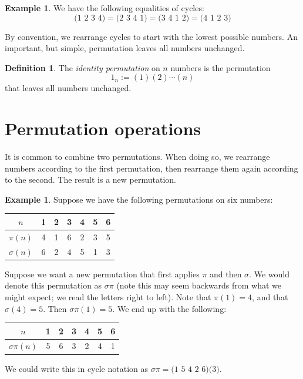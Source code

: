 \documentclass{book}
\theoremstyle{plain}
\theoremstyle{definition}
\newtheorem{definition}[theorem]{Definition}
\newtheorem{example}[theorem]{Example}
\begin{document}
\begin{example}
We have the following equalities of cycles: $$\text{(1 2 3 4)} = \text{(2 3 4 1)} = \text{(3 4 1 2)} = \text{(4 1 2 3)}$$
\end{example}

By convention, we rearrange cycles to start with the lowest possible numbers. An important, but simple, permutation leaves all numbers unchanged.

\begin{definition}
The {\it identity permutation} on $n$ numbers is the permutation $$1_n := (1)(2)\cdots(n)$$ that leaves all numbers unchanged.
\end{definition}

\section{Permutation operations}
It is common to combine two permutations. When doing so, we rearrange numbers according to the first permutation, then rearrange them again according to the second. The result is a new permutation.

\begin{example}
Suppose we have the following permutations on six numbers:
\begin{center}
\begin{tabular}{|c|cccccc|}
\hline
$n$ & 1 & 2 & 3 & 4 & 5 & 6 \\
\hline
$\pi(n)$ & 4 & 1 & 6 & 2 & 3 & 5 \\
\hline
$\sigma(n)$ & 6 & 2 & 4 & 5 & 1 & 3 \\
\hline
\end{tabular}
\end{center}

Suppose we want a new permutation that first applies $\pi$ and then $\sigma$. We would denote this permutation as $\sigma\pi$ (note this may seem backwards from what we might expect; we read the letters right to left). Note that $\pi(1) = 4$, and that $\sigma(4) = 5$. Then $\sigma\pi(1) = 5$. We end up with the following:
\begin{center}
\begin{tabular}{|c|cccccc|}
\hline
$n$ & 1 & 2 & 3 & 4 & 5 & 6 \\
\hline
$\sigma\pi(n)$ & 5 & 6 & 3 & 2 & 4 & 1 \\
\hline
\end{tabular}
\end{center}
We could write this in cycle notation as $\sigma\pi = \text{(1 5 4 2 6)(3)}$.
\end{example}
\end{document}
